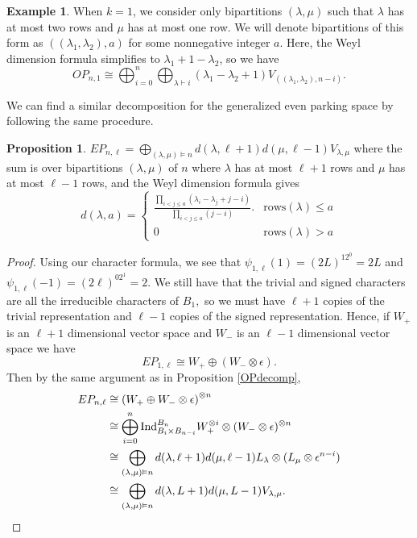 \documentclass{amsart}
\theoremstyle{plain}
\theoremstyle{definition}
\newtheorem{example}[theorem]{Example}
\newtheorem{proposition}[theorem]{Proposition}
\begin{document}
\begin{example} \label{ex:WeylOP}
    When $k=1$, we consider only bipartitions $(\lambda,\mu)$ such that $\lambda$ has at most two rows and $\mu$ has at most one row. We will denote bipartitions of this form as $((\lambda_1, \lambda_2),a)$ for some nonnegative integer $a$. Here, the Weyl dimension formula simplifies to $\lambda_1+1-\lambda_2$, so we have 
    \begin{equation}
    OP_{n,1}\cong \bigoplus_{i=0}^n \bigoplus_{\lambda \vdash i} (\lambda_1 - \lambda_2 + 1)V_{((\lambda_1, \lambda_2),n-i)}.
    \end{equation}
\end{example}
We can find a similar decomposition for the generalized even parking space by following the same procedure. 
\begin{proposition}\label{epdecomp }
   $EP_{n,\ell }=\bigoplus_{(\lambda,\mu)\vDash n} d(\lambda, \ell+1)d(\mu,\ell -1)V_{\lambda,\mu}$
     where the sum is over bipartitions $(\lambda,\mu)$ of $n$ where $\lambda$ has at most $\ell +1$ rows and $\mu$ has at most $\ell-1$ rows, and the Weyl dimension formula gives
    $$d(\lambda,a)=\begin{cases} \frac{\prod_{i < j \leq a} (\lambda_i - \lambda_j+j-i)}{\prod_{i<j \leq a}{(j-i)}}. & \text{rows}(\lambda)\le a \\
    0 & \text{rows}(\lambda)>a\end{cases}$$
\end{proposition}
\begin{proof}
Using our character formula, we see that $\psi_{1,\ell }(1)=(2L)^12^0=2L$ and $\psi_{1,\ell }(-1)= (2\ell )^02^1=2.$ We still have that the trivial and signed characters are all the irreducible characters of $B_1,$ so we must have $\ell +1$ copies of the trivial representation and $\ell -1$ copies of the signed representation. Hence, if $W_+$ is an $\ell +1$ dimensional vector space and $W_-$ is an $\ell -1 $ dimensional vector space we have 
$$ EP_{1,\ell }\cong  W_+\oplus (W_-\otimes \epsilon).$$
Then by the same argument as in Proposition \ref{OPdecomp},
\begin{align*}
    EP_{n,\ell }&\cong  \left( W_+\oplus W_-\otimes\epsilon \right)^{\otimes n} \\
    &\cong \bigoplus_{i=0}^n \mathrm{Ind}_{B_i\times B_{n-i}}^{B_n} W_+^{\otimes i} \otimes (W_-\otimes \epsilon)^{\otimes n}\\
    &\cong \bigoplus_{(\lambda,\mu)\vDash n}d(\lambda,\ell +1)d(\mu,\ell-1) L_{\lambda}\otimes(L_{\mu}\otimes \epsilon^{n-i})\\
    &\cong \bigoplus_{(\lambda,\mu)\vDash n}d(\lambda,L+1)d(\mu,L-1)V_{\lambda,\mu}.\qedhere
\end{align*}
\end{proof}
\end{document}

